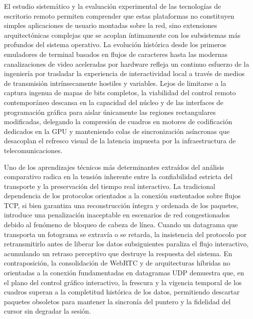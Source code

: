 \documentclass[12pt]{article}
\begin{document}
El estudio sistemático y la evaluación experimental de las tecnologías de escritorio remoto permiten comprender que estas plataformas no constituyen simples aplicaciones de usuario montadas sobre la red, sino extensiones arquitectónicas complejas que se acoplan íntimamente con los subsistemas más profundos del sistema operativo. La evolución histórica desde los primeros emuladores de terminal basados en flujos de caracteres hasta las modernas canalizaciones de video aceleradas por hardware refleja un continuo esfuerzo de la ingeniería por trasladar la experiencia de interactividad local a través de medios de transmisión intrínsecamente hostiles y variables. Lejos de limitarse a la captura ingenua de mapas de bits completos, la viabilidad del control remoto contemporáneo descansa en la capacidad del núcleo y de las interfaces de programación gráfica para aislar únicamente las regiones rectangulares modificadas, delegando la compresión de cuadros en motores de codificación dedicados en la GPU y manteniendo colas de sincronización asíncronas que desacoplan el refresco visual de la latencia impuesta por la infraestructura de telecomunicaciones.

Uno de los aprendizajes técnicos más determinantes extraídos del análisis comparativo radica en la tensión inherente entre la confiabilidad estricta del transporte y la preservación del tiempo real interactivo. La tradicional dependencia de los protocolos orientados a la conexión sustentados sobre flujos TCP, si bien garantiza una reconstrucción íntegra y ordenada de los paquetes, introduce una penalización inaceptable en escenarios de red congestionados debido al fenómeno de bloqueo de cabeza de línea. Cuando un datagrama que transporta un fotograma se extravía o se retarda, la insistencia del protocolo por retransmitirlo antes de liberar los datos subsiguientes paraliza el flujo interactivo, acumulando un retraso perceptivo que destruye la respuesta del sistema. En contraposición, la consolidación de WebRTC y de arquitecturas híbridas no orientadas a la conexión fundamentadas en datagramas UDP demuestra que, en el plano del control gráfico interactivo, la frescura y la vigencia temporal de los cuadros superan a la completitud histórica de los datos, permitiendo descartar paquetes obsoletos para mantener la sincronía del puntero y la fidelidad del cursor sin degradar la sesión.
\end{document}
